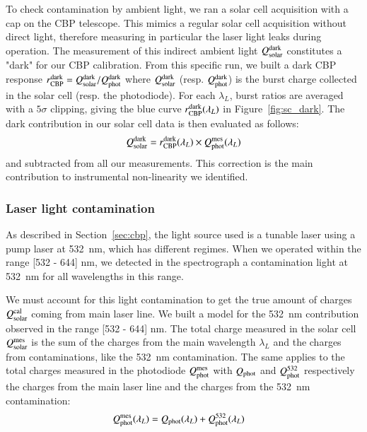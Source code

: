 To check contamination by ambient light, we ran a solar cell acquisition with a cap on the CBP telescope. This mimics a regular solar cell acquisition without direct light, therefore measuring in particular the laser light leaks during operation. The measurement of this indirect ambient light $Q_{\mathrm{solar}}^{\rm dark}$ constitutes a "dark" for our CBP calibration. From this specific run, we built a dark CBP response $r_{\mathrm{CBP}}^{\rm dark} = Q_{\mathrm{solar}}^{\rm dark} / Q_{\mathrm{phot}}^{\rm dark}$ where $Q_{\mathrm{solar}}^{\rm dark}$ (resp. $Q_{\mathrm{phot}}^{\rm dark}$) is the burst charge collected in the solar cell (resp. the photodiode). For each $\lambda_L$, burst ratios are averaged with a $5\sigma$ clipping, giving the blue curve $r_{\mathrm{CBP}}^{\rm dark}(\lambda_L)$ in Figure~\ref{fig:sc_dark}. The dark contribution in our solar cell data is then evaluated as follows:
\begin{equation}
    Q_{\mathrm{solar}}^{\rm dark} = r_{\mathrm{CBP}}^{\rm dark}(\lambda_L) \times Q_{\mathrm{phot}}^{\mathrm{mes}}(\lambda_L)
\end{equation}
and subtracted from all our measurements. This correction is the main contribution to instrumental non-linearity we identified. 


\subsubsection{Laser light contamination}
\label{sec:532_cont}

As described in Section~\ref{sec:cbp}, the light source used is a tunable laser using a pump laser at \SI{532}{\nano\meter}, which has different regimes. When we operated within the range [532 - 644] nm, we detected in the spectrograph a contamination light at \SI{532}{\nano\meter} for all wavelengths in this range. 

We must account for this light contamination to get the true amount of charges $Q_{\mathrm{solar}}^{\mathrm{cal}}$ coming from main laser line. We built a model for the \SI{532}{\nano\meter} contribution observed in the range [532 - 644] nm. The total charge measured in the solar cell $Q_{\mathrm{solar}}^{\mathrm{mes}}$ is the sum of the charges from the main wavelength $\lambda_L$ and the charges from contaminations, like the \SI{532}{\nm} contamination. The same applies to the total charges measured in the photodiode $Q_{\mathrm{phot}}^{\mathrm{mes}}$ with $Q_{\mathrm{phot}}$ and $Q_{\mathrm{phot}}^{532}$ respectively the charges from the main laser line and the charges from the \SI{532}{\nm} contamination:
\begin{align}
Q_{\mathrm{phot}}^{\mathrm{mes}}(\lambda_L) & = Q_{\mathrm{phot}}(\lambda_L) + Q_{\mathrm{phot}}^{532}(\lambda_L) \label{eq:qphot_mes}
\end{align}

